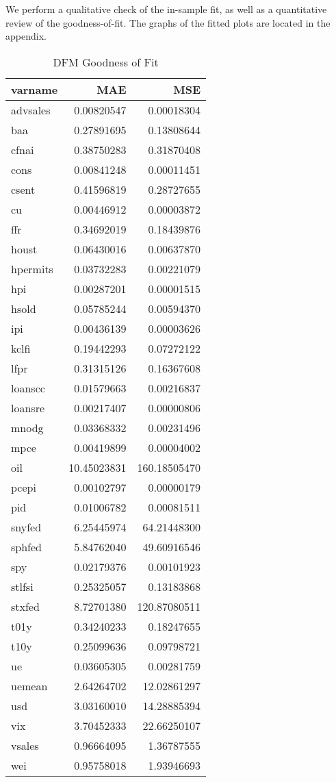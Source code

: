\documentclass[11pt, letterpaper]{article}\usepackage[]{graphicx}\usepackage[]{color}
\begin{document}
We perform a qualitative check of the in-sample fit, as well as a quantitative review of the goodness-of-fit. The graphs of the fitted plots are located in the appendix.
\begin{table}[H]
\centering
\begingroup\footnotesize
\begin{tabular}{lrr}
  \hline
varname & MAE & MSE \\ 
  \hline
advsales & 0.00820547 & 0.00018304 \\ 
  baa & 0.27891695 & 0.13808644 \\ 
  cfnai & 0.38750283 & 0.31870408 \\ 
  cons & 0.00841248 & 0.00011451 \\ 
  csent & 0.41596819 & 0.28727655 \\ 
  cu & 0.00446912 & 0.00003872 \\ 
  ffr & 0.34692019 & 0.18439876 \\ 
  houst & 0.06430016 & 0.00637870 \\ 
  hpermits & 0.03732283 & 0.00221079 \\ 
  hpi & 0.00287201 & 0.00001515 \\ 
  hsold & 0.05785244 & 0.00594370 \\ 
  ipi & 0.00436139 & 0.00003626 \\ 
  kclfi & 0.19442293 & 0.07272122 \\ 
  lfpr & 0.31315126 & 0.16367608 \\ 
  loanscc & 0.01579663 & 0.00216837 \\ 
  loansre & 0.00217407 & 0.00000806 \\ 
  mnodg & 0.03368332 & 0.00231496 \\ 
  mpce & 0.00419899 & 0.00004002 \\ 
  oil & 10.45023831 & 160.18505470 \\ 
  pcepi & 0.00102797 & 0.00000179 \\ 
  pid & 0.01006782 & 0.00081511 \\ 
  snyfed & 6.25445974 & 64.21448300 \\ 
  sphfed & 5.84762040 & 49.60916546 \\ 
  spy & 0.02179376 & 0.00101923 \\ 
  stlfsi & 0.25325057 & 0.13183868 \\ 
  stxfed & 8.72701380 & 120.87080511 \\ 
  t01y & 0.34240233 & 0.18247655 \\ 
  t10y & 0.25099636 & 0.09798721 \\ 
  ue & 0.03605305 & 0.00281759 \\ 
  uemean & 2.64264702 & 12.02861297 \\ 
  usd & 3.03160010 & 14.28885394 \\ 
  vix & 3.70452333 & 22.66250107 \\ 
  vsales & 0.96664095 & 1.36787555 \\ 
  wei & 0.95758018 & 1.93946693 \\ 
   \hline
\end{tabular}
\endgroup
\caption{DFM Goodness of Fit} 
\end{table}
\end{document}
